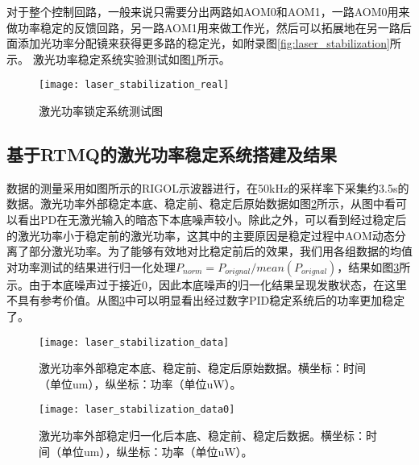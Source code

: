 对于整个控制回路，一般来说只需要分出两路如AOM0和AOM1，一路AOM0用来做功率稳定的反馈回路，另一路AOM1用来做工作光，然后可以拓展地在另一路后面添加光功率分配镜来获得更多路的稳定光，如附录图\ref{fig:laser_stabilization}所示。
激光功率稳定系统实验测试如图\ref{fig:laser_stabilization_real}所示。

\begin{figure}
    \centering
    \caption[激光功率锁定系统测试图]{激光功率锁定系统测试图\label{fig:laser_stabilization_real}}
    \texttt{[image: laser\_stabilization\_real]}
\end{figure}


\subsection[基于RTMQ的激光功率稳定系统搭建及结果]{基于RTMQ的激光功率稳定系统搭建及结果}

数据的测量采用如图所示的RIGOL示波器进行，在50kHz的采样率下采集约3.5s的数据。激光功率外部稳定本底、稳定前、稳定后原始数据如图\ref{fig:laser_stabilization_data}所示，从图中看可以看出PD在无激光输入的暗态下本底噪声较小。除此之外，可以看到经过稳定后的激光功率小于稳定前的激光功率，这其中的主要原因是稳定过程中AOM动态分离了部分激光功率。为了能够有效地对比稳定前后的效果，我们用各组数据的均值对功率测试的结果进行归一化处理$P_{norm}=P_{orignal}/mean(P_{orignal})$，结果如图\ref{fig:laser_stabilization_data0}所示。由于本底噪声过于接近0，因此本底噪声的归一化结果呈现发散状态，在这里不具有参考价值。从图\ref{fig:laser_stabilization_data0}中可以明显看出经过数字PID稳定系统后的功率更加稳定了。

\begin{figure}
    \centering
    \caption[激光功率外部稳定原始数据]{激光功率外部稳定本底、稳定前、稳定后原始数据。横坐标：时间（单位um），纵坐标：功率（单位uW）。\label{fig:laser_stabilization_data}}
    \texttt{[image: laser\_stabilization\_data]}
\end{figure}

\begin{figure}
    \centering
    \caption[激光功率外部稳定归一化后数据]{激光功率外部稳定归一化后本底、稳定前、稳定后数据。横坐标：时间（单位um），纵坐标：功率（单位uW）。\label{fig:laser_stabilization_data0}}
    \texttt{[image: laser\_stabilization\_data0]}
\end{figure}

